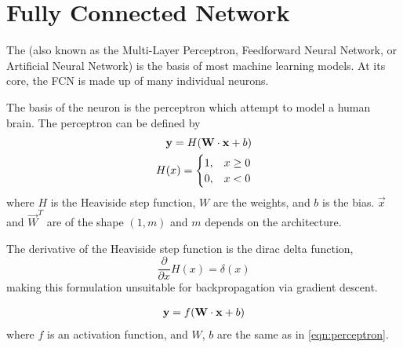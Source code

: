 \section{Fully Connected Network}

The  (also known as the Multi-Layer Perceptron, Feedforward Neural Network, or Artificial Neural Network) is the basis of most machine learning models. At its core, the FCN is made up of many individual neurons.

The basis of the neuron is the perceptron which attempt to model a human brain. The perceptron can be defined by
\begin{gather}
    \label{eqn:perceptron}
    \begin{split}
        \mathbf y = H(\mathbf W \cdot \mathbf x + b) \\
        H(x) =
        \begin{cases}
            1,& x \geq 0 \\
            0,& x<0
        \end{cases}
    \end{split}
\end{gather}
where $H$ is the Heaviside step function, $W$ are the weights, and $b$ is the bias. $\vec x$ and $\vec W^T$ are of the shape $(1, m)$ and $m$ depends on the architecture.

The derivative of the Heaviside step function is the dirac delta function,
\begin{equation}
    \frac{\partial}{\partial x} H(x) = \delta (x)
\end{equation}
making this formulation unsuitable for backpropagation via gradient descent.

\begin{gather}
    \label{eqn:neuron}
    \mathbf y = f(\mathbf W \cdot \mathbf x + b)
\end{gather}
where $f$ is an activation function, and $W$, $b$ are the same as in \autoref{eqn:perceptron}.


